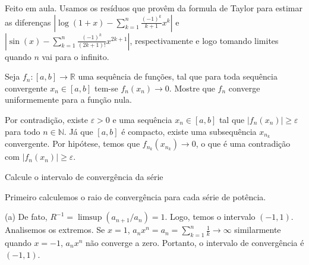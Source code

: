 \documentclass[11pt]{exam}
\begin{document}
\begin{questions}
\begin{parts}
   \part[8] 
 $ \log(1+x)=\sum_{n=1}^{\infty} \frac{(-1)^{n}}{n+1} x^n, \text{ para todo } x\in(-1,1]$.
   \end{parts}
  \begin{solution}
  Feito em aula. Usamos os resíduos que provêm da formula de Taylor para estimar as diferenças $|\log(1+x)-\sum_{k=1}^{n} \frac{(-1)^{k}}{k+1} x^k|$
  e $|\sin(x)-\sum_{k=1}^{n} \frac{(-1)^{k}}{(2k+1)!} x^{2k+1}|$, 
  respectivamente e logo tomando limites quando $n$ vai para o infinito.
  \end{solution} 
  \question[20] Seja $f_{n}:[a,b]\rightarrow \mathbb{R}$ uma sequência de funções, tal que para toda sequência convergente $x_{n} \in [a,b]$
 tem-se $f_n(x_n) \rightarrow 0$.
 Mostre que $f_{n}$ converge uniformemente para a função nula. 
   \begin{solution}
   Por contradição, existe $\varepsilon>0$ e uma sequência 
   $x_{n} \in [a,b]$
   tal que $|f_{n}(x_{n})|\geq \varepsilon$ para todo $n \in \mathbb{N}$. 
   Já que $[a,b]$ é compacto, 
   existe uma subsequência $x_{n_k}$ convergente. Por hipótese, 
   temos que $f_{n_k}(x_{n_k}) \rightarrow 0$, o que é uma contradição com 
    $|f_{n}(x_{n})|\geq \varepsilon$.
   \end{solution}
  \question Calcule o intervalo de convergência da série 
    \begin{solution}
  Primeiro calculemos o raio de convergência para cada série de potência.
  
   (a) De fato, $R^{-1}=\limsup (a_{n+1}/a_n)=1$. Logo, temos o intervalo
   $(-1,1)$. Analisemos os extremos. Se $x=1$, 
   $a_{n}x^{n}=a_{n}=\sum_{k=1}^{n}\frac{1}{k} \rightarrow \infty$ similarmente quando $x=-1$, $a_{n}x^{n}$ não converge a zero. 
   Portanto, o intervalo de convergência é $(-1,1)$.
   

\end{solution}
\end{questions}
\end{document}

